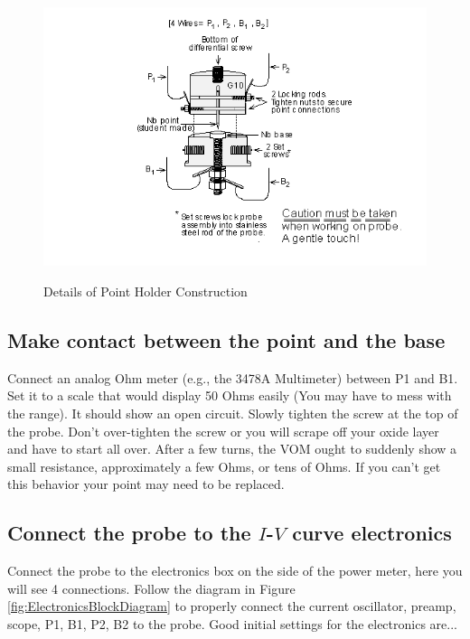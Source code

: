 \documentclass{../lab}
\begin{document}
\begin{figure}[h]
    \centering
    \href{http://experimentationlab.berkeley.edu/sites/default/files/images/JOS14.gif}{\includegraphics[width=0.85\linewidth]{images/JOS14.png}}
    \caption{Details of Point Holder Construction}
    \label{fig:DetailsOfPointHolderConstruction}
\end{figure}

\subsection{Make contact between the point and the base}

Connect an analog Ohm meter (e.g., the 3478A Multimeter) between P1 and B1. Set it to a scale that would display 50 Ohms easily (You may have to mess with the range). It should show an open circuit. Slowly tighten the screw at the top of the probe. Don't over-tighten the screw or you will scrape off your oxide layer and have to start all over. After a few turns, the VOM ought to suddenly show a small resistance, approximately a few Ohms, or tens of Ohms. If you can't get this behavior your point may need to be replaced.

\subsection{Connect the probe to the \texorpdfstring{$I$-$V$}{I-V} curve electronics}

Connect the probe to the electronics box on the side of the power meter, here you will see 4 connections. Follow the diagram in Figure \ref{fig:ElectronicsBlockDiagram} to properly connect the current oscillator, preamp, scope, P1, B1, P2, B2 to the probe. Good initial settings for the electronics are...
\end{document}
